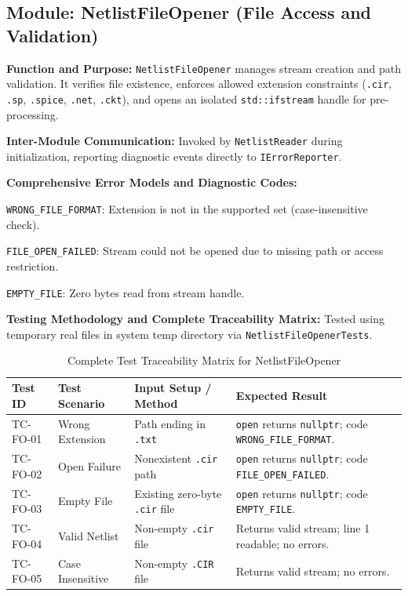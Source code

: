 \subsection{Module: NetlistFileOpener (File Access and Validation)}

\textbf{Function and Purpose:} \texttt{NetlistFileOpener} manages stream creation and path validation. It verifies file existence, enforces allowed extension constraints (\texttt{.cir}, \texttt{.sp}, \texttt{.spice}, \texttt{.net}, \texttt{.ckt}), and opens an isolated \texttt{std::ifstream} handle for pre-processing.

\textbf{Inter-Module Communication:} Invoked by \texttt{NetlistReader} during initialization, reporting diagnostic events directly to \texttt{IErrorReporter}.

\textbf{Comprehensive Error Models and Diagnostic Codes:}
\begin{compactitem}
    \item \texttt{WRONG\_FILE\_FORMAT}: Extension is not in the supported set (case-insensitive check).
    \item \texttt{FILE\_OPEN\_FAILED}: Stream could not be opened due to missing path or access restriction.
    \item \texttt{EMPTY\_FILE}: Zero bytes read from stream handle.
\end{compactitem}

\textbf{Testing Methodology and Complete Traceability Matrix:} Tested using temporary real files in system temp directory via \texttt{NetlistFileOpenerTests}.

\begin{table}[H]
\centering
\small
\begin{tabular}{|l|l|p{4.5cm}|p{4.5cm}|}
\hline
\textbf{Test ID} & \textbf{Test Scenario} & \textbf{Input Setup / Method} & \textbf{Expected Result} \\
\hline
TC-FO-01 & Wrong Extension & Path ending in \texttt{.txt} & \texttt{open} returns \texttt{nullptr}; code \texttt{WRONG\_FILE\_FORMAT}. \\
\hline
TC-FO-02 & Open Failure & Nonexistent \texttt{.cir} path & \texttt{open} returns \texttt{nullptr}; code \texttt{FILE\_OPEN\_FAILED}. \\
\hline
TC-FO-03 & Empty File & Existing zero-byte \texttt{.cir} file & \texttt{open} returns \texttt{nullptr}; code \texttt{EMPTY\_FILE}. \\
\hline
TC-FO-04 & Valid Netlist & Non-empty \texttt{.cir} file & Returns valid stream; line 1 readable; no errors. \\
\hline
TC-FO-05 & Case Insensitive & Non-empty \texttt{.CIR} file & Returns valid stream; no errors. \\
\hline
\end{tabular}
\caption{Complete Test Traceability Matrix for NetlistFileOpener}
\end{table}


